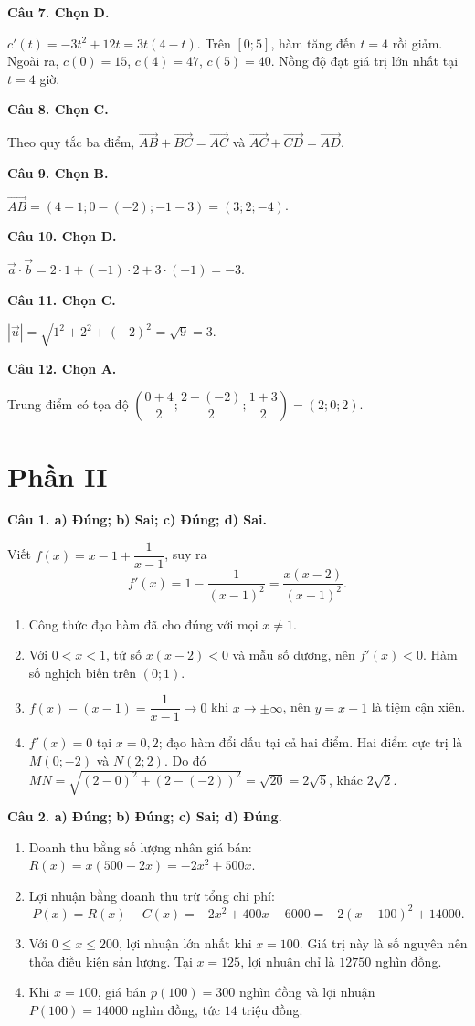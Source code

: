 \documentclass[12pt,a4paper]{article}
\newcommand{\loigiai}[1]{\par\medskip\Needspace{4\baselineskip}\noindent\textbf{#1}\par\nobreak}
\begin{document}
\loigiai{Câu 7. Chọn D.}
$c'(t)=-3t^2+12t=3t(4-t)$. Trên $[0;5]$, hàm tăng đến $t=4$ rồi giảm.
Ngoài ra, $c(0)=15$, $c(4)=47$, $c(5)=40$. Nồng độ đạt giá trị lớn nhất tại $t=4$ giờ.

\loigiai{Câu 8. Chọn C.}
Theo quy tắc ba điểm, $\overrightarrow{AB}+\overrightarrow{BC}=\overrightarrow{AC}$ và
$\overrightarrow{AC}+\overrightarrow{CD}=\overrightarrow{AD}$.

\loigiai{Câu 9. Chọn B.}
$\overrightarrow{AB}=(4-1;0-(-2);-1-3)=(3;2;-4)$.

\loigiai{Câu 10. Chọn D.}
$\vec a\cdot\vec b=2\cdot1+(-1)\cdot2+3\cdot(-1)=-3$.

\loigiai{Câu 11. Chọn C.}
$|\vec u|=\sqrt{1^2+2^2+(-2)^2}=\sqrt9=3$.

\loigiai{Câu 12. Chọn A.}
Trung điểm có tọa độ $\left(\dfrac{0+4}2;\dfrac{2+(-2)}2;\dfrac{1+3}2\right)=(2;0;2)$.

\newpage
\section*{\large Phần II}
\loigiai{Câu 1. a) Đúng; b) Sai; c) Đúng; d) Sai.}
Viết $f(x)=x-1+\dfrac1{x-1}$, suy ra
\[
f'(x)=1-\frac1{(x-1)^2}=\frac{x(x-2)}{(x-1)^2}.
\]
\begin{enumerate}[label=\alph*),leftmargin=*,itemsep=4pt]
\item Công thức đạo hàm đã cho đúng với mọi $x\ne1$.
\item Với $0<x<1$, tử số $x(x-2)<0$ và mẫu số dương, nên $f'(x)<0$. Hàm số nghịch biến trên $(0;1)$.
\item $f(x)-(x-1)=\dfrac1{x-1}\to0$ khi $x\to\pm\infty$, nên $y=x-1$ là tiệm cận xiên.
\item $f'(x)=0$ tại $x=0,2$; đạo hàm đổi dấu tại cả hai điểm. Hai điểm cực trị là $M(0;-2)$ và $N(2;2)$.
Do đó $MN=\sqrt{(2-0)^2+(2-(-2))^2}=\sqrt{20}=2\sqrt5$, khác $2\sqrt2$.
\end{enumerate}

\loigiai{Câu 2. a) Đúng; b) Đúng; c) Sai; d) Đúng.}
\begin{enumerate}[label=\alph*),leftmargin=*,itemsep=4pt]
\item Doanh thu bằng số lượng nhân giá bán: $R(x)=x(500-2x)=-2x^2+500x$.
\item Lợi nhuận bằng doanh thu trừ tổng chi phí:
\[
P(x)=R(x)-C(x)=-2x^2+400x-6000=-2(x-100)^2+14000.
\]
\item Với $0\le x\le200$, lợi nhuận lớn nhất khi $x=100$. Giá trị này là số nguyên nên thỏa điều kiện sản lượng. Tại $x=125$, lợi nhuận chỉ là $12750$ nghìn đồng.
\item Khi $x=100$, giá bán $p(100)=300$ nghìn đồng và lợi nhuận $P(100)=14000$ nghìn đồng, tức $14$ triệu đồng.
\end{enumerate}
\end{document}
